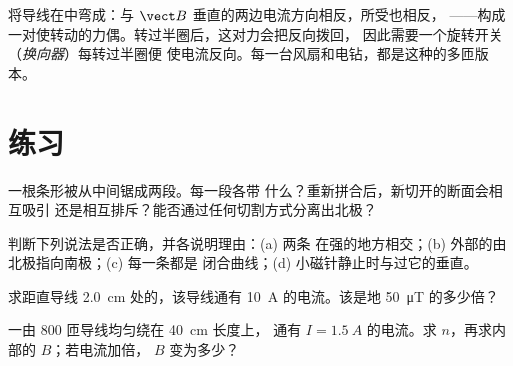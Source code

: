 \begin{remark}[直流电动机]\label{rem:g11:magnetic-fields:motor}
将导线在中弯成：与
$\vect B$ 垂直的两边电流方向相反，所受也相反，
——构成一对使转动的力偶。转过半圈后，这对力会把反向拨回，
因此需要一个旋转开关（\emph{换向器}）每转过半圈便
使电流反向。每一台风扇和电钻，都是这种的多匝版本。
\end{remark}

\section{练习}

\begin{exercise}[$\star$]\label{exo:g11:magnetic-fields:1}
一根条形被从中间锯成两段。每一段各带
什么？重新拼合后，新切开的断面会相互吸引
还是相互排斥？能否通过任何切割方式分离出北极？
\end{exercise}

\begin{exercise}[$\star$]\label{exo:g11:magnetic-fields:2}
判断下列说法是否正确，并各说明理由：(a) 两条
在强的地方相交；(b) 外部的由
北极指向南极；(c) 每一条都是
闭合曲线；(d) 小磁针静止时与过它的垂直。
\end{exercise}

\begin{exercise}[$\star$]\label{exo:g11:magnetic-fields:3}
求距直导线 \qty{2.0}{cm} 处的，该导线通有
\qty{10}{A} 的电流。该是地 \qty{50}{\micro T} 的多少倍？
\end{exercise}

\begin{exercise}[$\star$]\label{exo:g11:magnetic-fields:4}
一由 $800$ 匝导线均匀绕在 \qty{40}{cm} 长度上，
通有 $I = \qty{1.5}{A}$ 的电流。求 $n$，再求内部的 $B$；若电流加倍，
$B$ 变为多少？
\end{exercise}

